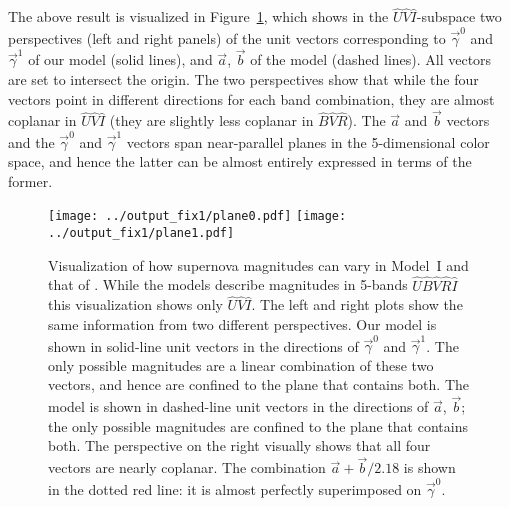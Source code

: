 \documentclass[trackchanges]{aastex61}   	%
\begin{document}
The above result is visualized in Figure~\ref{plane:fig}, which  shows  in the
${\hat{U}}{\hat{V}}\hat{I}$-subspace
two perspectives (left and right panels)
of the unit vectors corresponding to $\vec{\gamma}^0$ and  $\vec{\gamma}^1$ of our model (solid lines),
and $\vec{a}$, $\vec{b}$ of the  model (dashed lines).  All  vectors are set to intersect the origin.
The two perspectives show that while the four vectors point in different directions for each band combination,
they are almost coplanar in ${\hat{U}}{\hat{V}}{\hat{I}}$ (they are slightly less coplanar in ${\hat{B}}{\hat{V}}{\hat{R}}$).  The $\vec{a}$ and $\vec{b}$ vectors and the $\vec{\gamma}^0$ and $\vec{\gamma}^1$
vectors span near-parallel planes in the 5-dimensional color space, and hence the latter can be almost entirely expressed in terms of
the former.

\begin{figure}[htbp] %
   \centering
   \texttt{[image: ../output\_fix1/plane0.pdf]}
   \texttt{[image: ../output\_fix1/plane1.pdf]}
   \caption{
   Visualization of how supernova magnitudes can vary in Model~I and that of .  While the models describe
   magnitudes in 5-bands ${\hat{U}}{\hat{B}}{\hat{V}}{\hat{R}}{\hat{I}}$ this visualization shows only ${\hat{U}}{\hat{V}}{\hat{I}}$.   The left and right plots show the same information from
   two different perspectives.
   Our model is shown in solid-line unit vectors in the directions of $\vec{\gamma}^0$ and $\vec{\gamma}^1$. The only possible magnitudes
   are a linear combination of these two vectors, and hence are confined to the plane that contains both.
   The   model is shown in dashed-line unit vectors
   in the directions of  $\vec{a}$, $\vec{b}$; the only possible magnitudes are confined to the plane that contains both.
   The perspective on the right visually shows that all four vectors are nearly coplanar.  
   The combination $\vec{a}+\vec{b}/2.18$ is shown in the dotted red
   line: it is almost perfectly superimposed on $\vec{\gamma}^0$.
   \label{plane:fig}}
\end{figure}
\end{document}
